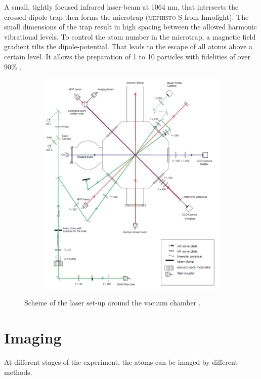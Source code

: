  A small, tightly focused infrared laser-beam at 1064 nm, that intersects the crossed dipole-trap then forms the microtrap (\textsc{mephisto S} from Innolight). The small dimensions of the trap result in high spacing between the allowed harmonic vibrational levels. To control the atom number in the microtrap, a magnetic field gradient tilts the dipole-potential. That leads to the escape of all atoms above a certain level. It allows the preparation of 1 to 10 particles with fidelities of over 90\% \cite{preparation}.	 
\begin{figure}[h]
\centering
\begin{subfigure}[b]{0.8\textwidth}
                \includegraphics[width=\textwidth]{scheme}
\end{subfigure}
\caption{Scheme of the laser set-up around the vacuum chamber \cite{lompe}. }
\label{scheme}
\end{figure}
\section{Imaging}

At different stages of the experiment, the atoms can be imaged by different methods.

